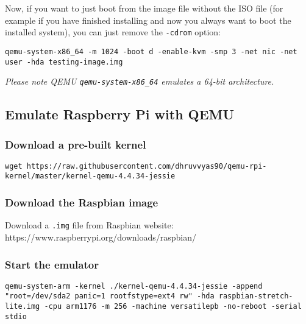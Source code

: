 Now, if you want to just boot from the image file without the ISO file
(for example if you have finished installing and now you always want to
boot the installed system), you can just remove the \texttt{-cdrom}
option:

\begin{verbatim}
qemu-system-x86_64 -m 1024 -boot d -enable-kvm -smp 3 -net nic -net user -hda testing-image.img
\end{verbatim}

\emph{Please note QEMU \texttt{qemu-system-x86\_64} emulates a 64-bit
architecture.}

\hypertarget{emulate-raspberry-pi-with-qemu}{%
\subsection{Emulate Raspberry Pi with
QEMU}\label{emulate-raspberry-pi-with-qemu}}

\hypertarget{download-a-pre-built-kernel}{%
\subsubsection{Download a pre-built
kernel}\label{download-a-pre-built-kernel}}

\begin{verbatim}
wget https://raw.githubusercontent.com/dhruvvyas90/qemu-rpi-kernel/master/kernel-qemu-4.4.34-jessie
\end{verbatim}

\hypertarget{download-the-raspbian-image}{%
\subsubsection{Download the Raspbian
image}\label{download-the-raspbian-image}}

Download a \texttt{.img} file from Raspbian website:
https://www.raspberrypi.org/downloads/raspbian/

\hypertarget{start-the-emulator}{%
\subsubsection{Start the emulator}\label{start-the-emulator}}

\begin{verbatim}
qemu-system-arm -kernel ./kernel-qemu-4.4.34-jessie -append "root=/dev/sda2 panic=1 rootfstype=ext4 rw" -hda raspbian-stretch-lite.img -cpu arm1176 -m 256 -machine versatilepb -no-reboot -serial stdio
\end{verbatim}

